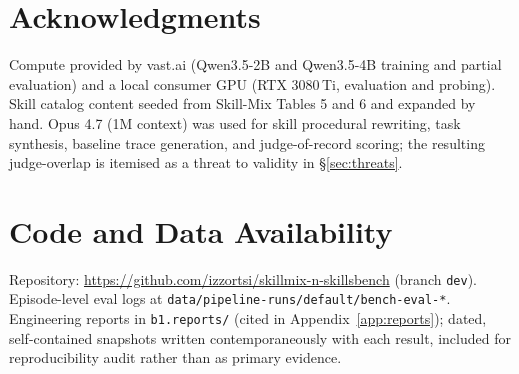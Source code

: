 \documentclass[10pt]{article}
\newcommand{\Qwent}{Qwen3.5-2B\xspace}
\newcommand{\Qwenf}{Qwen3.5-4B\xspace}
\begin{document}
\section*{Acknowledgments}
Compute provided by vast.ai (\Qwent{} and \Qwenf{} training and partial evaluation) and a local consumer GPU (RTX 3080\,Ti, evaluation and probing). Skill catalog content seeded from Skill-Mix \citep{yu2024skillmix} Tables 5 and 6 and expanded by hand. Opus 4.7 (1M context) was used for skill procedural rewriting, task synthesis, baseline trace generation, and judge-of-record scoring; the resulting judge-overlap is itemised as a threat to validity in \S\ref{sec:threats}.

\section*{Code and Data Availability}
Repository: \url{https://github.com/izzortsi/skillmix-n-skillsbench} (branch \texttt{dev}). Episode-level eval logs at \texttt{data/pipeline-runs/default/bench-eval-*}. Engineering reports in \texttt{b1.reports/} (cited in Appendix~\ref{app:reports}); dated, self-contained snapshots written contemporaneously with each result, included for reproducibility audit rather than as primary evidence.
\end{document}
